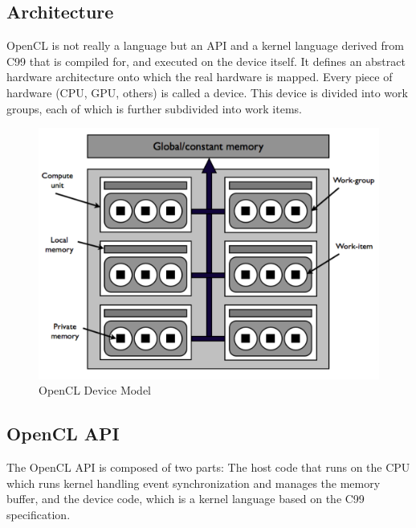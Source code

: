 \subsection{Architecture}

\gls{OpenCL} is not really a language but an \gls{API} and a kernel language derived from C99 that is compiled for, and executed on the device itself. It defines an abstract hardware architecture onto which the real hardware is mapped. Every piece of hardware (\gls{CPU}, \gls{GPU}, others) is called a device. This device is divided into work groups, each of which is further subdivided into work items.

\begin{figure}[H]
\caption{OpenCL Device Model}
\centering
\includegraphics[scale=0.5]{OpenCL_Device_Model.pdf}
\end{figure}

\subsection{OpenCL API}

The \gls{OpenCL} \gls{API} is composed of two parts: The host code that runs on the CPU which runs kernel handling event synchronization and manages the memory buffer, and the device code, which is a kernel language based on the C99 specification.

